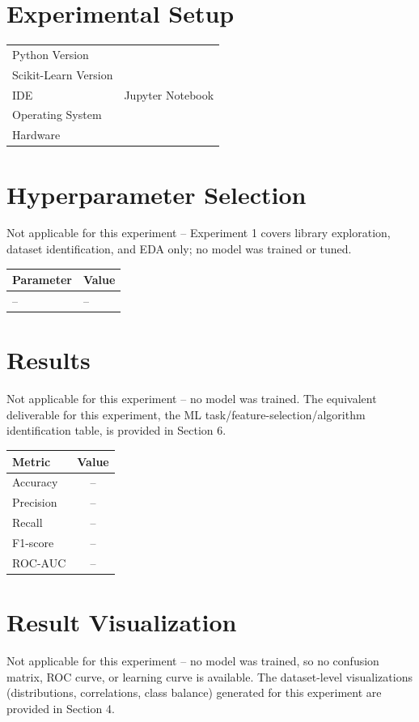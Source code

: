 \documentclass[12pt,a4paper]{article}
\begin{document}
\section{Experimental Setup}
\begin{tabular}{ll}
\toprule
Python Version & \\
Scikit-Learn Version & \\
IDE & Jupyter Notebook \\
Operating System & \\
Hardware & \\
\bottomrule
\end{tabular}

\section{Hyperparameter Selection}
Not applicable for this experiment -- Experiment 1 covers library exploration, dataset
identification, and EDA only; no model was trained or tuned.

\begin{tabular}{ll}
\toprule
Parameter & Value\\
\midrule
-- & -- \\
\bottomrule
\end{tabular}

\section{Results}
Not applicable for this experiment -- no model was trained. The equivalent deliverable for
this experiment, the ML task/feature-selection/algorithm identification table, is provided in
Section 6.

\begin{tabular}{lc}
\toprule
Metric & Value\\
\midrule
Accuracy & -- \\
Precision & -- \\
Recall & -- \\
F1-score & -- \\
ROC-AUC & -- \\
\bottomrule
\end{tabular}

\section{Result Visualization}
Not applicable for this experiment -- no model was trained, so no confusion matrix, ROC
curve, or learning curve is available. The dataset-level visualizations (distributions,
correlations, class balance) generated for this experiment are provided in Section 4.
\end{document}
